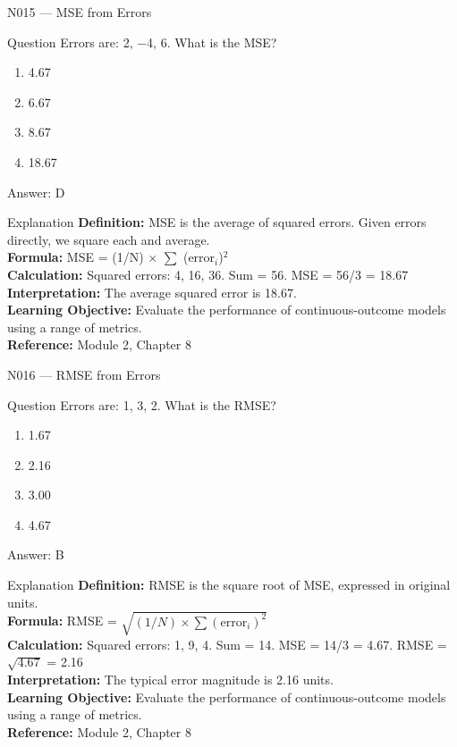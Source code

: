 \documentclass[aspectratio=169,8pt]{beamer}
\begin{document}
	\begin{frame}{N015 --- MSE from Errors}
		\begin{block}{Question}
			Errors are: 2, $-$4, 6. What is the MSE?
			\begin{enumerate}
				\item 4.67
				\item 6.67
				\item 8.67
				\item 18.67
			\end{enumerate}
		\end{block}
		\begin{exampleblock}{Answer: D}\end{exampleblock}
		\begin{block}{Explanation}
			\textbf{Definition:} MSE is the average of squared errors. Given errors directly, we square each and average.\\
			\textbf{Formula:} MSE = (1/N) $\times$ $\sum$ (error$_{i}$)$^{2}$\\
			\textbf{Calculation:} Squared errors: 4, 16, 36. Sum = 56. MSE = 56/3 = 18.67\\
			\textbf{Interpretation:} The average squared error is 18.67.\\
			\textbf{Learning Objective:} Evaluate the performance of continuous-outcome models using a range of metrics.\\
			\textbf{Reference:} Module 2, Chapter 8
		\end{block}
	\end{frame}
	
	\begin{frame}{N016 --- RMSE from Errors}
		\begin{block}{Question}
			Errors are: 1, 3, 2. What is the RMSE?
			\begin{enumerate}
				\item 1.67
				\item 2.16
				\item 3.00
				\item 4.67
			\end{enumerate}
		\end{block}
		\begin{exampleblock}{Answer: B}\end{exampleblock}
		\begin{block}{Explanation}
			\textbf{Definition:} RMSE is the square root of MSE, expressed in original units.\\
			\textbf{Formula:} RMSE = $\sqrt{(1/N) \times \sum (\text{error}_{i})^{2}}$\\
			\textbf{Calculation:} Squared errors: 1, 9, 4. Sum = 14. MSE = 14/3 = 4.67. RMSE = $\sqrt{4.67}$ = 2.16\\
			\textbf{Interpretation:} The typical error magnitude is 2.16 units.\\
			\textbf{Learning Objective:} Evaluate the performance of continuous-outcome models using a range of metrics.\\
			\textbf{Reference:} Module 2, Chapter 8
		\end{block}
	\end{frame}
	
\end{document}
